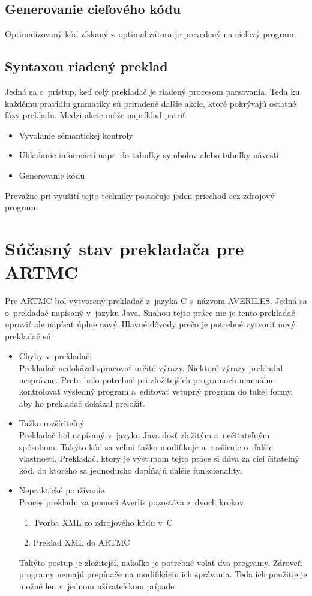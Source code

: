 \section{Generovanie cieľového kódu}
Optimalizovaný kód získaný z~optimalizátora je prevedený na cieľový program.

\section{Syntaxou riadený preklad}
\label{sec_synta}
Jedná sa o~prístup, keď celý prekladač je riadený procesom parsovania. Teda ku každému pravidlu gramatiky sú priradené ďalšie akcie, ktoré pokrývajú ostatné fázy prekladu. Medzi akcie môže napríklad patriť:
\begin{itemize}
    \item Vyvolanie sémantickej kontroly
    \item Ukladanie informácií napr. do tabuľky symbolov alebo tabuľky návestí
    \item Generovanie kódu
\end{itemize}
Prevažne pri využití tejto techniky postačuje jeden priechod cez zdrojový program.


\chapter{Súčasný stav prekladača pre ARTMC}
\label{kap_averiles}
Pre ARTMC bol vytvorený prekladač z~jazyka C s~názvom AVERILES. Jedná sa
o~prekladač napísaný v~jazyku Java. Snahou tejto práce nie je tento prekladač
upraviť ale napísať úplne nový. Hlavné dôvody prečo je potrebné vytvoriť nový
prekladač sú:
\begin{itemize}
    \item Chyby v~prekladači\\
        Prekladač nedokázal spracovať určité výrazy. Niektoré výrazy prekladal nesprávne.
        Preto bolo potrebné pri zložitejších programoch manuálne kontrolovať výsledný
        program a~editovať vstupný program do takej formy, aby ho prekladač dokázal
        preložiť.
    \item Tažko rozšíriteľný\\
        Prekladač bol napísaný v~jazyku Java dosť zložitým a~nečitateľným spôsobom. Takýto
        kód sa veľmi ťažko modifikuje a~rozširuje o~ďalšie vlastnosti. Prekladač,
        ktorý je výstupom tejto práce si dáva za cieľ čitateľný kód, do ktorého
        sa jednoducho dopĺňajú ďalšie funkcionality.
    \item Nepraktické používanie\\
        Proces prekladu za pomoci Averlis pozostáva z~dvoch krokov
        \begin{enumerate}
            \item Tvorba XML zo zdrojového kódu v~C
            \item Preklad XML do ARTMC
        \end{enumerate}
        Takýto postup je zložitejší, nakoľko je potrebné volať dva programy.
        Zároveň programy nemajú prepínače na modifikáciu ich správania. Teda
        ich použitie je možné len v~jednom užívateľskom prípade
\end{itemize}

